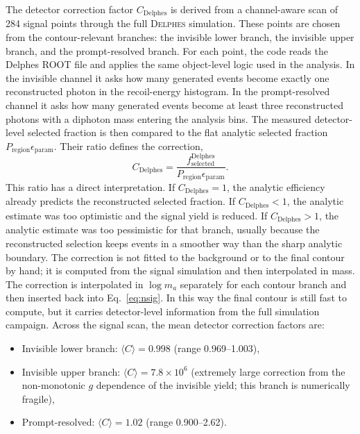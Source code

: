 \documentclass[12pt,a4paper]{article}
\begin{document}
The detector correction factor $C_\mathrm{Delphes}$ is derived from
a channel-aware scan of 284 signal points through the full \textsc{Delphes}
simulation.
These points are chosen from the contour-relevant branches: the invisible lower
branch, the invisible upper branch, and the prompt-resolved branch. For each
point, the code reads the Delphes ROOT file and applies the same object-level
logic used in the analysis. In the invisible channel it asks how many generated
events become exactly one reconstructed photon in the recoil-energy histogram.
In the prompt-resolved channel it asks how many generated events become at
least three reconstructed photons with a diphoton mass entering the analysis
bins. The measured detector-level selected fraction is then compared to the
flat analytic selected fraction $P_\mathrm{region}\epsilon_\mathrm{param}$.
Their ratio defines the correction,
\begin{equation}
    C_\mathrm{Delphes}
    =
    \frac{
      f_\mathrm{selected}^\mathrm{Delphes}
    }{
      P_\mathrm{region}\epsilon_\mathrm{param}
    }.
    \label{eq:delphes_correction}
\end{equation}
This ratio has a direct interpretation. If $C_\mathrm{Delphes}=1$, the analytic
efficiency already predicts the reconstructed selected fraction. If
$C_\mathrm{Delphes}<1$, the analytic estimate was too optimistic and the signal
yield is reduced. If $C_\mathrm{Delphes}>1$, the analytic estimate was too
pessimistic for that branch, usually because the reconstructed selection keeps
events in a smoother way than the sharp analytic boundary. The correction is
not fitted to the background or to the final contour by hand; it is computed
from the signal simulation and then interpolated in mass.
The correction is interpolated in $\log m_a$ separately for each contour branch
and then inserted back into Eq.~\eqref{eq:nsig}. In this way the final contour
is still fast to compute, but it carries detector-level information from the
full simulation campaign.
Across the signal scan, the mean detector correction factors are:
\begin{itemize}
    \item Invisible lower branch: $\langle C \rangle = 0.998$ (range 0.969--1.003),
    \item Invisible upper branch: $\langle C \rangle = 7.8\times10^6$ (extremely large
    correction from the non-monotonic $g$ dependence of the invisible yield; this
    branch is numerically fragile),
    \item Prompt-resolved: $\langle C \rangle = 1.02$ (range 0.900--2.62).
\end{itemize}
\end{document}

